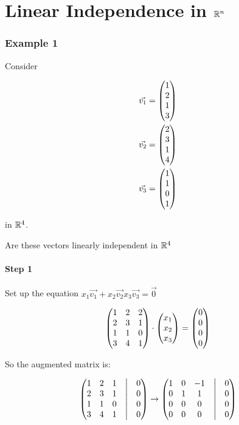 \documentclass[a4paper]{article}
\begin{document}
\part*{Linear Independence in $\mathbb{R}^n$}
\section{Example 1}
Consider 

\[
\begin{aligned}
	\vec{v_1} &=  \begin{pmatrix} 1\\2\\1\\3 \end{pmatrix}  \\
	\vec{v_2} &=  \begin{pmatrix} 2\\3\\1\\4 \end{pmatrix}  \\
	\vec{v_3} &=  \begin{pmatrix} 1\\1\\0\\1 \end{pmatrix} 
\end{aligned}
\]

in $\mathbb{R}^4$.

Are these vectors linearly independent in $\mathbb{R}^4$

\subsection{Step 1}
Set up the equation $x_1 \vec{v_1} + x_2 \vec{v_2} x_3 \vec{v_3} = \vec{0}$

\[
	 \begin{pmatrix} 
		1&2&2\\
		2&3&1\\
		1&1&0\\
		3&4&1\\
	 \end{pmatrix} 
	\cdot
	 \begin{pmatrix} x_1\\x_2\\x_3 \end{pmatrix} 
	=
	 \begin{pmatrix} 0\\0\\0\\0 \end{pmatrix} 
\]

So the augmented matrix is:

\[
	 \begin{pmatrix} 
		1&2&1& \bigm| & 0 \\
		2&3&1& \bigm| & 0 \\
		1&1&0& \bigm| & 0 \\
		3&4&1& \bigm| & 0 \\
	 \end{pmatrix}  \to
 \begin{pmatrix} 
		1&0&-1& \bigm| & 0 \\
		0&1&1& \bigm| & 0 \\
		0&0&0& \bigm| & 0 \\
		0&0&0& \bigm| & 0 \\
	 \end{pmatrix} 
\]
\end{document}
